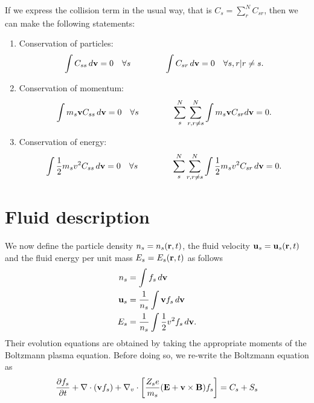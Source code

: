 \documentclass[a4paper,11pt]{report}
\begin{document}
If we express the collision term in the usual way, that is $C_s = \sum_r^N C_{s r}$, then we can make the following statements:
\begin{enumerate}
\item Conservation of particles:
\begin{equation}
    \label{eq:coll_cons_particles}
    \int C_{ss} \, d\mathbf{v} = 0 \quad \forall s \qquad \qquad
    \int C_{sr} \,d\mathbf{v} = 0 \quad \forall s, r | r \ne s.
\end{equation}

\item Conservation of momentum:
\begin{equation}
    \label{eq:coll_cons_momentum}
    \int m_s \mathbf{v} C_{ss} \, d\mathbf{v} = 0 \quad \forall s \qquad \qquad \sum_s^N \sum_{r, r \ne s}^N \int m_s \mathbf{v} C_{sr} d\mathbf{v} = 0.
\end{equation}

\item Conservation of energy:
\begin{equation}
    \label{eq:coll_cons_energy}
    \int \frac{1}{2} m_s v^2 C_{ss} \, d\mathbf{v} = 0 \quad \forall s \qquad \qquad \sum_s^N \sum_{r, r \ne s}^N \int \frac{1}{2} m_s v^2 C_{sr} \, d\mathbf{v} = 0.
\end{equation}

\end{enumerate}

\section{Fluid description}
We now define the particle density $n_s = n_s(\mathbf{r},t)$, the fluid velocity $\mathbf{u}_s = \mathbf{u}_s(\mathbf{r},t)$ and the fluid energy per unit mass $E_s = E_s(\mathbf{r},t)$ as follows
\begin{align}
n_s &= \int f_s \, d\mathbf{v} \\
\mathbf{u}_s &= \frac{1}{n_s} \int \mathbf{v} f_s \, d\mathbf{v} \\
E_s &= \frac{1}{n_s} \int \frac{1}{2} v^2 f_s \, d\mathbf{v}.
\end{align}
Their evolution equations are obtained by taking the appropriate moments of the Boltzmann plasma equation. Before doing so, we re-write the Boltzmann equation as
\begin{equation}
\label{eq:boltz_mod}
\frac{\partial f_s}{\partial t} + \nabla \cdot (\mathbf{v} f_s) + \nabla_v \cdot \left [ \frac{Z_s e}{m_s} ( \mathbf{E} + \mathbf{v} \times \mathbf{B} ) f_s \right ] = C_s + S_s
\end{equation}
\end{document}
